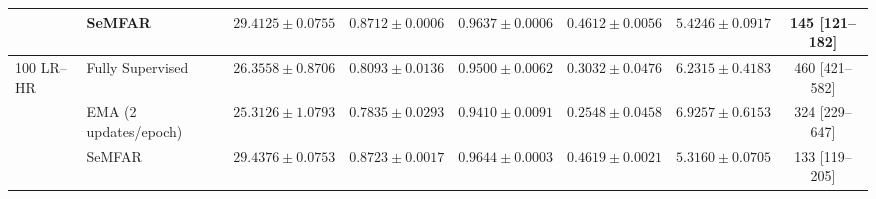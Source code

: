\begin{table}[t]
{\begin{tabular}{llcccccc}
& SeMFAR
& $\mathbf{29.4125 \pm 0.0755}$
& $\mathbf{0.8712 \pm 0.0006}$
& $\mathbf{0.9637 \pm 0.0006}$
& $\mathbf{0.4612 \pm 0.0056}$
& $\mathbf{5.4246 \pm 0.0917}$
& 145 [121--182] \\

\midrule

\multirow{3}{*}{100 LR--HR}
& Fully Supervised
& $26.3558 \pm 0.8706$
& $0.8093 \pm 0.0136$
& $0.9500 \pm 0.0062$
& $0.3032 \pm 0.0476$
& $6.2315 \pm 0.4183$
& 460 [421--582] \\


& EMA (2 updates/epoch)
& $25.3126 \pm 1.0793$
& $0.7835 \pm 0.0293$
& $0.9410 \pm 0.0091$
& $0.2548 \pm 0.0458$
& $6.9257 \pm 0.6153$
& 324 [229--647] \\


& SeMFAR
& $\mathbf{29.4376 \pm 0.0753}$
& $\mathbf{0.8723 \pm 0.0017}$
& $\mathbf{0.9644 \pm 0.0003}$
& $\mathbf{0.4619 \pm 0.0021}$
& $\mathbf{5.3160 \pm 0.0705}$
& 133 [119--205] \\

\bottomrule
\end{tabular}%
}
\end{table}
